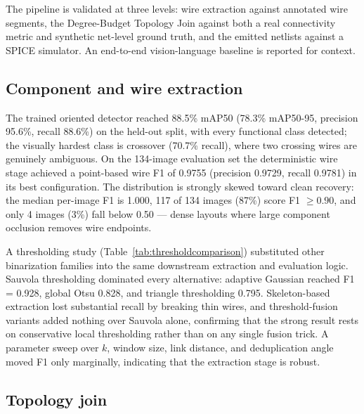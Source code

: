 The pipeline is validated at three levels: wire extraction against annotated wire
segments, the Degree-Budget Topology Join against both a real connectivity metric
and synthetic net-level ground truth, and the emitted netlists against a SPICE
simulator. An end-to-end vision-language baseline is reported for context.

\subsection*{Component and wire extraction}

The trained oriented detector reached 88.5\% mAP50 (78.3\% mAP50-95, precision
95.6\%, recall 88.6\%) on the held-out split, with every functional class
detected; the visually hardest class is crossover (70.7\% recall), where two
crossing wires are genuinely ambiguous. On the 134-image evaluation set the
deterministic wire stage achieved a point-based wire F1 of 0.9755 (precision
0.9729, recall 0.9781) in its best configuration. The distribution is strongly
skewed toward clean recovery: the median per-image F1 is 1.000, 117 of 134 images
(87\%) score F1 $\geq 0.90$, and only 4 images (3\%) fall below 0.50 --- dense
layouts where large component occlusion removes wire endpoints.

A thresholding study (Table~\ref{tab:thresholdcomparison}) substituted other
binarization families into the same downstream extraction and evaluation logic.
Sauvola thresholding dominated every alternative: adaptive Gaussian reached
F1 = 0.928, global Otsu 0.828, and triangle thresholding 0.795. Skeleton-based
extraction lost substantial recall by breaking thin wires, and threshold-fusion
variants added nothing over Sauvola alone, confirming that the strong result rests
on conservative local thresholding rather than on any single fusion trick. A
parameter sweep over $k$, window size, link distance, and deduplication angle
moved F1 only marginally, indicating that the extraction stage is robust.

\begin{table}[H]
\centering
\caption{Wire-extraction thresholding comparison on the 134-image benchmark, all run through the identical preprocessing, extraction, and evaluation logic.}

\label{tab:thresholdcomparison}
\end{table}

\subsection*{Topology join}

